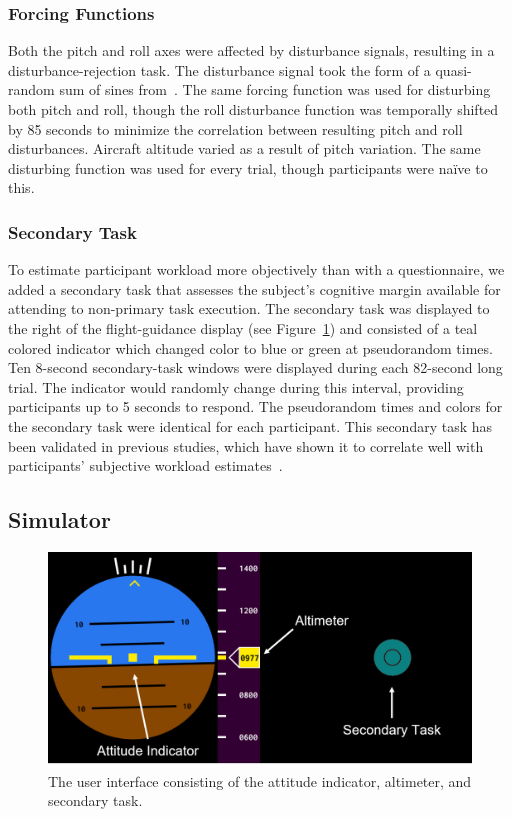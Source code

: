 \subsubsection{Forcing Functions}
Both the pitch and roll axes were affected by disturbance signals, resulting in a disturbance-rejection task.
The disturbance signal took the form of a quasi-random sum of sines from~\citet{doi:10.2514/1.39953}.
The same forcing function was used for disturbing both pitch and roll, though the roll disturbance function was temporally shifted by 85 seconds to minimize the correlation between resulting pitch and roll disturbances.
Aircraft altitude varied as a result of pitch variation.
The same disturbing function was used for every trial, though participants were naïve to this.

\subsubsection{Secondary Task}
To estimate participant workload more objectively than with a questionnaire, we added a secondary task that assesses the subject's cognitive margin available for attending to non-primary task execution.
The secondary task was displayed to the right of the flight-guidance display (see Figure~\ref{figure-hfes:userinterface}) and consisted of a teal colored indicator which changed color to blue or green at pseudorandom times.
Ten 8-second secondary-task windows were displayed during each 82-second long trial.
The indicator would randomly change during this interval, providing participants up to 5 seconds to respond.
The pseudorandom times and colors for the secondary task were identical for each participant.
This secondary task has been validated in previous studies, which have shown it to correlate well with participants' subjective workload estimates~\citep{hainley_pilot_2013}.

\subsection{Simulator}
\begin{figure}[ptb]
    \begin{center}
        \includegraphics[width=\linewidth]{figures/Aircraft/image1.png}
        \caption[The user interface]{The user interface consisting of the attitude indicator, altimeter, and secondary task.}
        \label{figure-hfes:userinterface}
    \end{center}
\end{figure}

